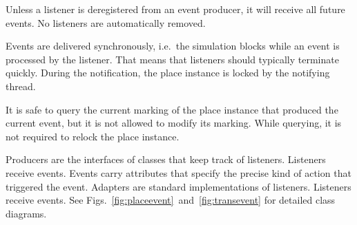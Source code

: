Unless a listener is deregistered from an event producer,
it will receive all future events. No listeners are automatically
removed.

Events are delivered synchronously, i.e.\ the simulation blocks while
an event is processed by the listener. That means that listeners
should typically terminate quickly. During the notification,
the place instance is locked by the notifying thread.

It is safe to query the current marking of the place instance
that produced the current event,
but it is not allowed to modify its marking.
While querying, it is not required to relock the place instance.


Producers are the interfaces of classes that keep track of listeners.
Listeners receive events. Events carry attributes that specify
the precise kind of action that triggered the event.
Adapters are standard implementations of listeners. Listeners
receive events. See Figs.\ \ref{fig:placeevent}~and~\ref{fig:transevent}
for detailed class diagrams.
